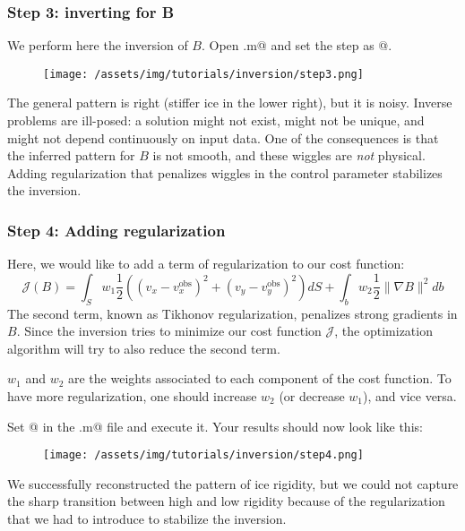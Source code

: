 \subsubsection{Step 3: inverting for B}
We perform here the inversion of $B$. Open \verb@runme.m@ and set the step as @.
\begin{figure}[H]
	\begin{center}
		\texttt{[image: /assets/img/tutorials/inversion/step3.png]}
	\end{center}
\end{figure}
The general pattern is right (stiffer ice in the lower right), but it is noisy. Inverse problems are
ill-posed: a solution might not exist, might not be unique, and might not depend continuously on
input data. One of the consequences is that the inferred pattern for $B$ is not smooth, and these
wiggles are \emph{not} physical. Adding regularization that penalizes wiggles in the control parameter stabilizes the inversion.

\subsubsection{Step 4: Adding regularization}
Here, we would like to add a term of regularization to our cost function:
\begin{equation}
	{\mathcal J\left(B\right)}
	=
	\int_{S} w_1 \dfrac{1}{2}\left(
	\left(v_x-v_x^{\text{obs}}\right)^{2}
	+\left(v_y-v_y^{\text{obs}}\right)^{2}
	\right) dS
	+
	\int_{b} w_2 \dfrac{1}{2}
	\|\nabla B \|^{2}
	db
\end{equation}
The second term, known as Tikhonov regularization, penalizes strong gradients in $B$. Since the inversion tries to minimize our cost function $\mathcal J$, the optimization algorithm will try to also reduce the second term.

$w_1$ and $w_2$ are the weights associated to each component of the cost function. To have more regularization, one should increase $w_2$ (or decrease $w_1$), and vice versa.

Set @ in the \verb@runme.m@ file and execute it. Your results should now look like this:
\begin{figure}[H]
	\begin{center}
		\texttt{[image: /assets/img/tutorials/inversion/step4.png]}
	\end{center}
\end{figure}
We successfully reconstructed the pattern of ice rigidity, but we could not capture the sharp transition between high and low rigidity because of the regularization that we had to introduce to stabilize the inversion.

